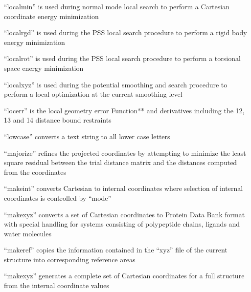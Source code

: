 \documentclass[letterpaper,11pt,english]{sphinxmanual}
\begin{document}
“localmin” is used during normal mode local search to perform a Cartesian coordinate energy minimization


“localrgd” is used during the PSS local search procedure to perform a rigid body energy minimization


“localrot” is used during the PSS local search procedure to perform a torsional space energy minimization


“localxyz” is used during the potential smoothing and search procedure to perform a local optimization at the current smoothing level


“locerr” is the local geometry error Function** and derivatives including the 1\sphinxhyphen{}2, 1\sphinxhyphen{}3 and 1\sphinxhyphen{}4 distance bound restraints


“lowcase” converts a text string to all lower case letters


“majorize” refines the projected coordinates by attempting to minimize the least square residual between the trial distance matrix and the distances computed from the coordinates


“makeint” converts Cartesian to internal coordinates where selection of internal coordinates is controlled by “mode”


“makexyz” converts a set of Cartesian coordinates to Protein Data Bank format with special handling for systems consisting of polypeptide chains, ligands and water molecules


“makeref” copies the information contained in the “xyz” file of the current structure into corresponding reference areas


“makexyz” generates a complete set of Cartesian coordinates for a full structure from the internal coordinate values
\end{document}
